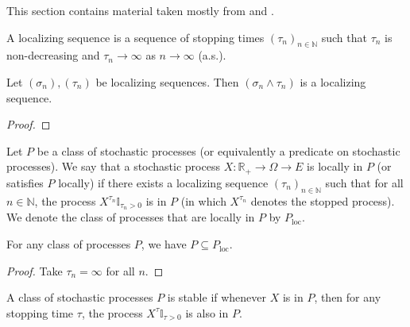 This section contains material taken mostly from \cite[Chapters 10 and 18]{kallenberg2021} and \cite{almostsuremath}.


\begin{definition}\label{def:localizingSequence}
  \leanok
A localizing sequence is a sequence of stopping times $(\tau_n)_{n \in \mathbb{N}}$ such that $\tau_n$ is non-decreasing and $\tau_n \to \infty$ as $n \to \infty$ (a.s.).
\end{definition}


\begin{lemma}\label{lem:localizingSequence_min}
Let $(\sigma_n), (\tau_n)$ be localizing sequences.
Then $(\sigma_n \wedge \tau_n)$ is a localizing sequence.
\end{lemma}

\begin{proof}

\end{proof}


\begin{definition}\label{def:locally}
  \leanok
Let $P$ be a class of stochastic processes (or equivalently a predicate on stochastic processes).
We say that a stochastic process $X : \mathbb{R}_+ \to \Omega \to E$ is locally in $P$ (or satisfies $P$ locally) if there exists a localizing sequence $(\tau_n)_{n \in \mathbb{N}}$ such that for all $n \in \mathbb{N}$, the process $X^{\tau_n}\mathbb{I}_{\tau_n > 0}$ is in $P$ (in which $X^{\tau_n}$ denotes the stopped process).
We denote the class of processes that are locally in $P$ by $P_{\mathrm{loc}}$.
\end{definition}


\begin{lemma}\label{lem:implies_locally}
  \leanok
For any class of processes $P$, we have $P \subseteq P_{\mathrm{loc}}$.
\end{lemma}

\begin{proof}
Take $\tau_n = \infty$ for all $n$.
\end{proof}


\begin{definition}\label{def:stable}
  \leanok
A class of stochastic processes $P$ is stable if whenever $X$ is in $P$, then for any stopping time $\tau$, the process $X^{\tau}\mathbb{I}_{\tau > 0}$ is also in $P$.
\end{definition}


